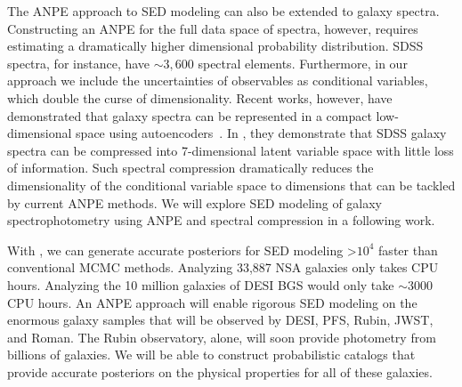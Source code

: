 The ANPE approach to SED modeling can also be extended to galaxy spectra. 
Constructing an ANPE for the full data space of spectra, however, requires
estimating a dramatically higher dimensional probability distribution. 
SDSS spectra, for instance, have ${\sim}3,600$ spectral elements.  
Furthermore, in our approach we include the uncertainties of observables as
conditional variables, which double the curse of dimensionality.
Recent works, however, have demonstrated that galaxy spectra can be represented
in a compact low-dimensional space using autoencoders~\citep[][; Melchior \&
Hahn in prep.]{portillo2020}.
In \cite{portillo2020}, they demonstrate that SDSS galaxy spectra can be
compressed into 7-dimensional latent variable space with little loss of
information. 
Such spectral compression dramatically reduces the dimensionality of the
conditional variable space to dimensions that can be tackled by current ANPE
methods. 
We will explore SED modeling of galaxy spectrophotometry using ANPE and
spectral compression in a following work. 

With \sedflow, we can generate accurate posteriors for SED modeling >$10^4$
faster than conventional MCMC methods. 
Analyzing 33,887 NSA galaxies only takes  CPU hours.
Analyzing the 10 million galaxies of DESI BGS would only take ${\sim}3000$ CPU
hours.
An ANPE approach will enable rigorous SED modeling on the enormous galaxy
samples that will be observed by DESI, PFS, Rubin, JWST, and Roman. 
The Rubin observatory, alone, will soon provide photometry from billions of
galaxies. 
We will be able to construct probabilistic catalogs that provide accurate
posteriors on the physical properties for all of these galaxies. 

